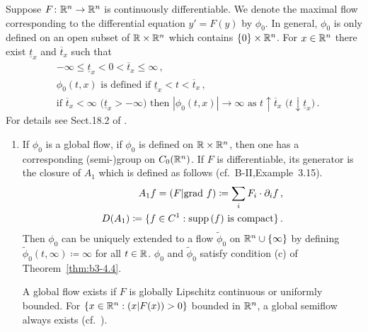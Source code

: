 \begin{example}\label{ex:b3-4.6}
	Suppose $F \colon \mathbb{R}^n \to \mathbb{R}^n$ is continuously differentiable.
	We denote the maximal flow corresponding to the differential equation $y' = F(y)$ by $\phi_{0}$.
	In general, $\phi_{0}$ is only defined on an open subset of $\mathbb{R} \times \mathbb{R}^n$ which contains $\{0\} \times \mathbb{R}^n$.
	For $x \in \mathbb{R}^n$ there exist $\underline{t}_{x}$ and $\overline{t}_{x}$ such that
	\begin{equation}\label{eq:b3-4.11}
		\begin{aligned}
			&-\infty \leq \underline{t}_{x} < 0 < \overline{t}_{x} \leq \infty\,, \\
			&\phi_{0}(t,x) \text{ is defined if } \underline{t}_{x} < t < \overline{t}_{x}\,, \\
			&\text{if } \overline{t}_{x} < \infty \text{ (}\underline{t}_{x} > -\infty\text{)} \text{ then } |\phi_{0}(t,x)| \to \infty \text{ as } t\uparrow\overline{t}_{x} \text{ (}t\downarrow\underline{t}_{x}\text{)}\,.
		\end{aligned}
	\end{equation}
	For details see Sect.18.2 of \citet{dieudonne:1971}.
	\begin{enumerate}[\upshape (a), wide, labelindent=.5em]
	\item
	If $\phi_{0}$ is a global flow, \ie if $\phi_{0}$ is defined on $\mathbb{R} \times \mathbb{R}^n$, then one has a corresponding (semi-)group on $C_{0}(\mathbb{R}^n)$.
	If $F$ is differentiable, its generator is the closure of $A_{1}$ which is defined as follows (cf.\ B-II,Example~3.15).
	\begin{equation}\label{eq:b3-4.12}
		\begin{aligned}
			A_{1}f = (F|\text{grad }f) \coloneq 
            {  \sum_i F_{i} \cdot \partial_{i}f} \,, \\
			D(A_{1}) \coloneq \{f \in C^1 : \mathop{}\!\mathrm{supp}\,(f)  \text{ is compact}\}\,.
		\end{aligned}
	\end{equation}
	Then $\phi_{0}$ can be uniquely extended to a flow $\tilde{\phi}_{0}$ on $\mathbb{R}^n\cup\{\infty\}$ by defining $\tilde{\phi}_{0}(t,\infty) \coloneq \infty$ for all $t \in \mathbb{R}$.
	$\phi_{0}$ and $\tilde{\phi}_{0}$ satisfy condition (c) of Theorem~\ref{thm:b3-4.4}.

    A global flow exists if $F$ is globally Lipschitz continuous or uniformly bounded. 
    For $\{x \in \mathbb{R}^n : (x|F(x)) > 0\}$ bounded in $\mathbb{R}^n$, a global semiflow always exists (cf.\ \citet[Section~5.2]{deimling:1977}).
    

\end{enumerate}
\end{example}
